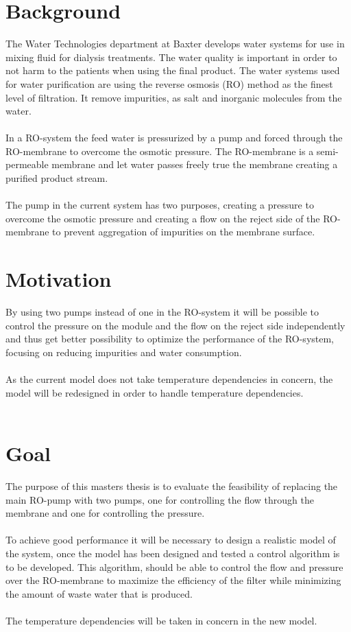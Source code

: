
\section{Background}

The Water Technologies department at Baxter develops water systems for use in mixing fluid for dialysis treatments. The water quality is important in order to not harm to the patients when using the final product. The water systems used for water purification are using the reverse osmosis (RO) method as the finest level of filtration. It remove impurities, as salt and inorganic molecules from the water\cite{Dow}.\\
\\
In a RO-system the feed water is pressurized by a pump and forced through the RO-membrane to overcome the osmotic pressure. The RO-membrane is a semi-permeable membrane and let water passes freely true the membrane creating a purified product stream. \\
\\
The pump in the current system has two purposes, creating a pressure to overcome the osmotic pressure and creating a flow on the reject side of the RO-membrane to prevent aggregation of impurities on the membrane surface.\\



\section{Motivation}
By using two pumps instead of one in the RO-system it will be possible to control the pressure on the module and the flow on the reject side independently and thus get better possibility to optimize the performance of the RO-system, focusing on reducing impurities and water consumption. \\
\\
As the current model does not take temperature dependencies in concern, the model will be redesigned in order to handle temperature dependencies.  \\
\\
\section{Goal}
The purpose of this masters thesis is to evaluate the feasibility of replacing the main RO-pump with two pumps, one for controlling the flow through the membrane and one for controlling the pressure. \\
\\
To achieve good performance it will be necessary to design a realistic model of the system, once the model has been designed and tested a control algorithm is to be developed. This algorithm, should be able to control the flow and pressure over the RO-membrane to maximize the efficiency of the filter while minimizing the amount of waste water that is produced. \\
\\
The temperature dependencies will be taken in concern in the new model.

